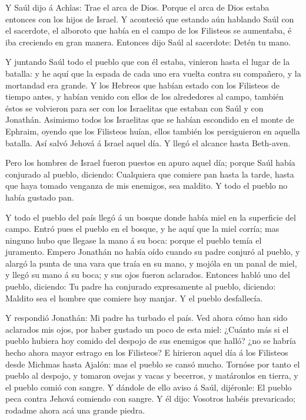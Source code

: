  Y Saúl dijo á Achîas: Trae el arca de Dios. Porque el arca
de Dios estaba entonces con los hijos de Israel.  Y
aconteció que estando aún hablando Saúl con el sacerdote, el alboroto
que había en el campo de los Filisteos se aumentaba, é iba creciendo en
gran manera. Entonces dijo Saúl al sacerdote: Detén tu mano.

 Y juntando Saúl todo el pueblo que con él estaba, vinieron
hasta el lugar de la batalla: y he aquí que la espada de cada uno era
vuelta contra su compañero, y la mortandad era grande.  Y
los Hebreos que habían estado con los Filisteos de tiempo antes, y
habían venido con ellos de los alrededores al campo, también éstos se
volvieron para ser con los Israelitas que estaban con Saúl y con
Jonathán.  Asimismo todos los Israelitas que se habían
escondido en el monte de Ephraim, oyendo que los Filisteos huían, ellos
también los persiguieron en aquella batalla.  Así salvó
Jehová á Israel aquel día. Y llegó el alcance hasta Beth-aven.

 Pero los hombres de Israel fueron puestos en apuro aquel
día; porque Saúl había conjurado al pueblo, diciendo: Cualquiera que
comiere pan hasta la tarde, hasta que haya tomado venganza de mis
enemigos, sea maldito. Y todo el pueblo no había gustado pan.

 Y todo el pueblo del país llegó á un bosque donde había
miel en la superficie del campo.  Entró pues el pueblo en
el bosque, y he aquí que la miel corría; mas ninguno hubo que llegase la
mano á su boca: porque el pueblo temía el juramento. 
Empero Jonathán no había oído cuando su padre conjuró al pueblo, y
alargó la punta de una vara que traía en su mano, y mojóla en un panal
de miel, y llegó su mano á su boca; y sus ojos fueron aclarados.
 Entonces habló uno del pueblo, diciendo: Tu padre ha
conjurado expresamente al pueblo, diciendo: Maldito sea el hombre que
comiere hoy manjar. Y el pueblo desfallecía.

 Y respondió Jonathán: Mi padre ha turbado el país. Ved
ahora cómo han sido aclarados mis ojos, por haber gustado un poco de
esta miel:  ¿Cuánto más si el pueblo hubiera hoy comido del
despojo de sus enemigos que halló? ¿no se habría hecho ahora mayor
estrago en los Filisteos?  E hirieron aquel día á los
Filisteos desde Michmas hasta Ajalón: mas el pueblo se cansó mucho.
 Tornóse por tanto el pueblo al despojo, y tomaron ovejas y
vacas y becerros, y matáronlos en tierra, y el pueblo comió con sangre.
 Y dándole de ello aviso á Saúl, dijéronle: El pueblo peca
contra Jehová comiendo con sangre. Y él dijo: Vosotros habéis
prevaricado; rodadme ahora acá una grande piedra.

